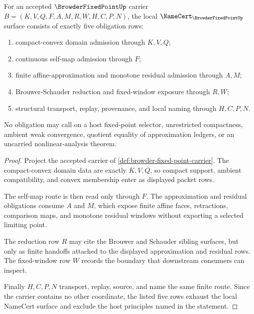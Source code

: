 \begin{theorem}
\label{thm:browder-fixed-point-namecert-obligations}
For an accepted $\BrowderFixedPointUp$ carrier $B=(K,V,Q,F,A,M,R,W,H,C,P,N)$, the local $\NameCert_{\BrowderFixedPointUp}$ surface consists of exactly five obligation rows:
\begin{enumerate}
\item compact-convex domain admission through $K,V,Q$;
\item continuous self-map admission through $F$;
\item finite affine-approximation and monotone residual admission through $A,M$;
\item Brouwer-Schauder reduction and fixed-window exposure through $R,W$;
\item structural transport, replay, provenance, and local naming through $H,C,P,N$.
\end{enumerate}
No obligation may call on a host fixed-point selector, unrestricted compactness, ambient weak convergence, quotient equality of approximation ledgers, or an uncarried nonlinear-analysis theorem.
\end{theorem}
\begin{proof}
Project the accepted carrier of \autoref{def:browder-fixed-point-carrier}. The compact-convex domain data are exactly $K,V,Q$, so compact support, ambient compatibility, and convex membership enter as displayed packet rows.

The self-map route is then read only through $F$. The approximation and residual obligations consume $A$ and $M$, which expose finite affine faces, retractions, comparison maps, and monotone residual windows without exporting a selected limiting point.

The reduction row $R$ may cite the Brouwer and Schauder sibling surfaces, but only as finite handoffs attached to the displayed approximation and residual rows. The fixed-window row $W$ records the boundary that downstream consumers can inspect.

Finally $H,C,P,N$ transport, replay, source, and name the same finite route. Since the carrier contains no other coordinate, the listed five rows exhaust the local NameCert surface and exclude the host principles named in the statement.
\end{proof}

